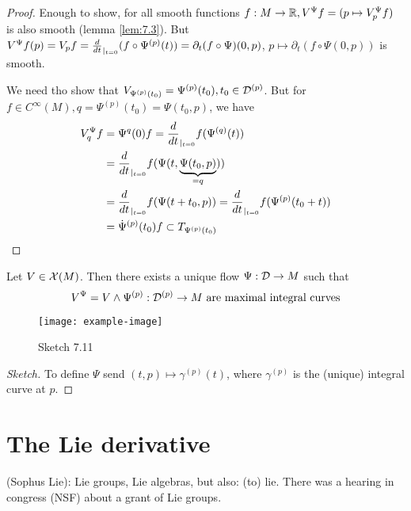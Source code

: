 \begin{proof}
     Enough to show, for all smooth functions \(f:M\to \mathbb{R}, V^\Psi f=(p\mapsto V_p^\Psi f)\) is also smooth (lemma \ref{lem:7.3}).
    But \(V^\Psi f(p)=V_p f=\frac{d}{dt}_{|_{t=0}}(f\circ \Psi^{(p)}(t))=\partial_t (f\circ \Psi)(0,p)\), \(p\mapsto \partial_t(f\circ \Psi(0,p))\) is smooth.

     We need tho show that \(V_{\Psi^{(p)}(t_0)}=\Psi^{(p)}(t_0),t_0\in\mathcal{D}^{(p)}\).
    But for \(f\in C^\infty(M),q=\Psi^{(p)}(t_0)=\Psi(t_0,p)\), we have 
    \begin{align*}
        V_q^{\Psi} f&=\Psi^{q}(0)f=\frac{d}{dt}_{|_{t=0}}f(\Psi^{(q)}(t))\\
        &=\frac{d}{dt}_{|_{t=0}}f(\Psi(t,\underbrace{\Psi(t_0,p)}_{=q}))\\
        &=\frac{d}{dt}_{|_{t=0}} f(\Psi(t+t_0,p))=\frac{d}{dt}_{|_{t=0}}f(\Psi^{(p)}(t_0+t))\\
        &=\dot{\Psi}^{(p)}(t_0)f\subset T_{\Psi^{(p)}(t_0)}  
    \end{align*}

\end{proof}


\begin{theorem}\label{thm:7.12}
    Let \(V\in \mathcal{X}(M)\). Then there exists a unique flow \(\Psi:\mathcal{D}\to M\) such that 
    \[V^{\Psi}=V\land\Psi^{(p)}:\mathcal{D}^{(p)}\to M \text{ are maximal integral curves}\]
    \begin{figure}[H]\label{fig:7.11}
        \centering
        \texttt{[image: example-image]}
        \caption{Sketch 7.11}
    \end{figure}
\end{theorem}

\begin{proof}[Sketch]
    To define \(\Psi\) send \((t,p)\mapsto \gamma^{(p)}(t)\), where \(\gamma^{(p)}\) is the (unique) 
    integral curve at \(p\).
\end{proof}

\section{The Lie derivative}

 (Sophus Lie): Lie groups, Lie algebras, but also: (to) lie. There was a hearing in congress (NSF)
about a grant of Lie groups.

